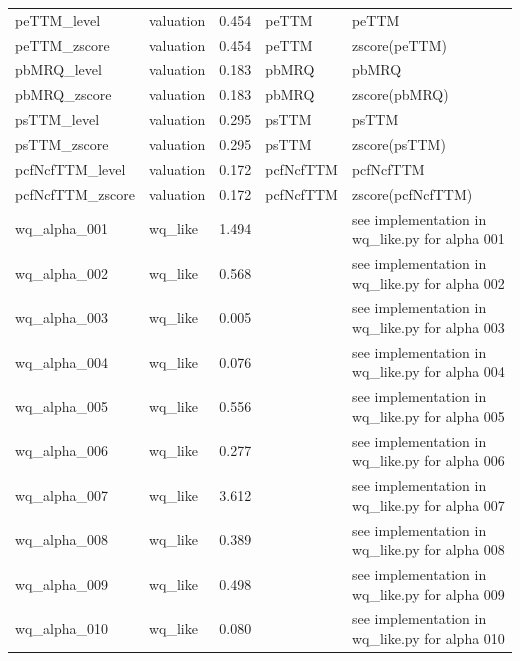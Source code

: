 \begin{longtable}{p{}p{}p{}p{}p{}}
peTTM\_level & valuation & 0.454 & peTTM & peTTM \\
peTTM\_zscore & valuation & 0.454 & peTTM & zscore(peTTM) \\
pbMRQ\_level & valuation & 0.183 & pbMRQ & pbMRQ \\
pbMRQ\_zscore & valuation & 0.183 & pbMRQ & zscore(pbMRQ) \\
psTTM\_level & valuation & 0.295 & psTTM & psTTM \\
psTTM\_zscore & valuation & 0.295 & psTTM & zscore(psTTM) \\
pcfNcfTTM\_level & valuation & 0.172 & pcfNcfTTM & pcfNcfTTM \\
pcfNcfTTM\_zscore & valuation & 0.172 & pcfNcfTTM & zscore(pcfNcfTTM) \\
wq\_alpha\_001 & wq\_like & 1.494 &  & see implementation in wq\_like.py for alpha 001 \\
wq\_alpha\_002 & wq\_like & 0.568 &  & see implementation in wq\_like.py for alpha 002 \\
wq\_alpha\_003 & wq\_like & 0.005 &  & see implementation in wq\_like.py for alpha 003 \\
wq\_alpha\_004 & wq\_like & 0.076 &  & see implementation in wq\_like.py for alpha 004 \\
wq\_alpha\_005 & wq\_like & 0.556 &  & see implementation in wq\_like.py for alpha 005 \\
wq\_alpha\_006 & wq\_like & 0.277 &  & see implementation in wq\_like.py for alpha 006 \\
wq\_alpha\_007 & wq\_like & 3.612 &  & see implementation in wq\_like.py for alpha 007 \\
wq\_alpha\_008 & wq\_like & 0.389 &  & see implementation in wq\_like.py for alpha 008 \\
wq\_alpha\_009 & wq\_like & 0.498 &  & see implementation in wq\_like.py for alpha 009 \\
wq\_alpha\_010 & wq\_like & 0.080 &  & see implementation in wq\_like.py for alpha 010 \\
\bottomrule
\end{longtable}
\normalsize
